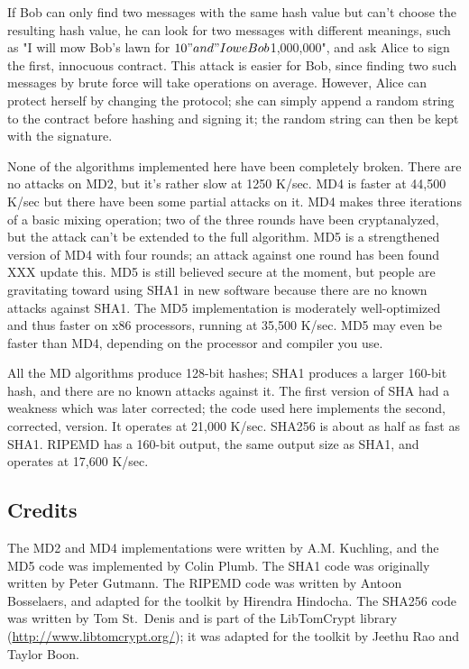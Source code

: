 \documentclass{howto}
\begin{document}
If Bob can only find two messages with the same hash value but can't
choose the resulting hash value, he can look for two messages with
different meanings, such as "I will mow Bob's lawn for $10" and "I owe
Bob $1,000,000", and ask Alice to sign the first, innocuous contract.
This attack is easier for Bob, since finding two such messages by brute
force will take  operations on average.  However,
Alice can protect herself by changing the protocol; she can simply
append a random string to the contract before hashing and signing it;
the random string can then be kept with the signature.

None of the algorithms implemented here have been completely broken.
There are no attacks on MD2, but it's rather slow at 1250 K/sec.  MD4
is faster at 44,500 K/sec but there have been some partial attacks on
it.  MD4 makes three iterations of a basic mixing operation; two of
the three rounds have been cryptanalyzed, but the attack can't be
extended to the full algorithm.  MD5 is a strengthened version of MD4
with four rounds; an attack against one round has been found XXX
update this.  MD5 is still believed secure at the moment, but people
are gravitating toward using SHA1 in new software because there are no
known attacks against SHA1.  The MD5 implementation is moderately
well-optimized and thus faster on x86 processors, running at 35,500
K/sec.  MD5 may even be faster than MD4, depending on the processor
and compiler you use.

All the MD algorithms produce 128-bit hashes; SHA1 produces a
larger 160-bit hash, and there are no known attacks against it.  The
first version of SHA had a weakness which was later corrected; the
code used here implements the second, corrected, version.  It operates
at 21,000 K/sec.  SHA256 is about as half as fast as SHA1.  RIPEMD has
a 160-bit output, the same output size as SHA1, and operates at 17,600
K/sec.

\subsection{Credits}
The MD2 and MD4 implementations were written by A.M. Kuchling, and the
MD5 code was implemented by Colin Plumb.  The SHA1 code was originally
written by Peter Gutmann.  The RIPEMD code was written by Antoon
Bosselaers, and adapted for the toolkit by Hirendra Hindocha.  The
SHA256 code was written by Tom St.~Denis and is part of the
LibTomCrypt library (\url{http://www.libtomcrypt.org/}); it was
adapted for the toolkit by Jeethu Rao and Taylor Boon.
\end{document}
